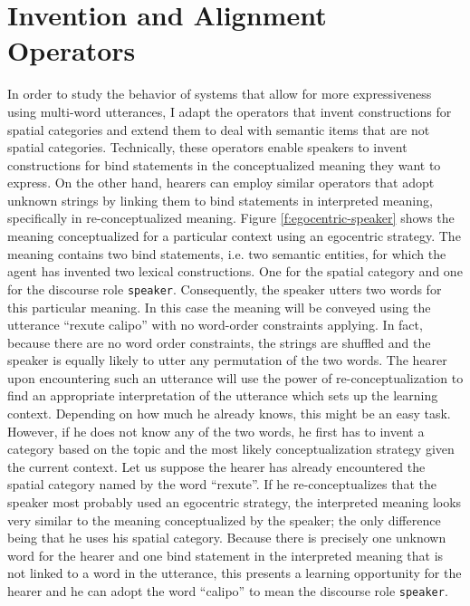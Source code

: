 \section{Invention and Alignment Operators}
In order to study the behavior of systems that allow for more expressiveness using 
multi-word utterances, I adapt the operators that invent constructions for spatial categories 
and extend them to deal with semantic items that are not spatial categories. 
Technically, these operators enable speakers to invent constructions for bind statements in the 
conceptualized meaning they want to express. On the other hand, hearers can employ 
similar operators that adopt unknown strings by linking them to bind statements in 
interpreted meaning, specifically in re-conceptualized meaning. 
Figure \ref{f:egocentric-speaker} shows the 
meaning conceptualized for a particular context using an egocentric strategy. The
meaning contains two bind statements, i.e. two semantic entities, for which the agent
has invented two lexical constructions. One for the spatial category and
one for the discourse role {\footnotesize\tt speaker}. Consequently, the speaker
utters two words for this particular meaning. In this case the meaning will be conveyed 
using the utterance ``rexute calipo'' with no word-order constraints applying. 
In fact, because there are no word order constraints, the strings are shuffled and the speaker 
is equally likely to utter any permutation of the two words. The hearer upon encountering such
an utterance will use the power of re-conceptualization to find an appropriate interpretation
of the utterance which sets up the learning context. Depending on how much he already knows, this might be an easy task. However, if he does not know any of the two words, 
he first has to invent a category based on the topic and the most likely conceptualization 
strategy given the current context.
Let us suppose the hearer has already encountered the spatial category named by the 
word ``rexute''. If he re-conceptualizes that the speaker most probably used an egocentric
strategy, the interpreted meaning looks very similar to the meaning conceptualized 
by the speaker; the only difference being that he uses his spatial category. 
Because there is precisely one unknown word for the hearer and one 
bind statement in the interpreted meaning
that is not linked to a word in the utterance, this presents a learning opportunity for the
hearer and he can adopt the word ``calipo'' to mean the discourse role {\footnotesize\tt speaker}.

